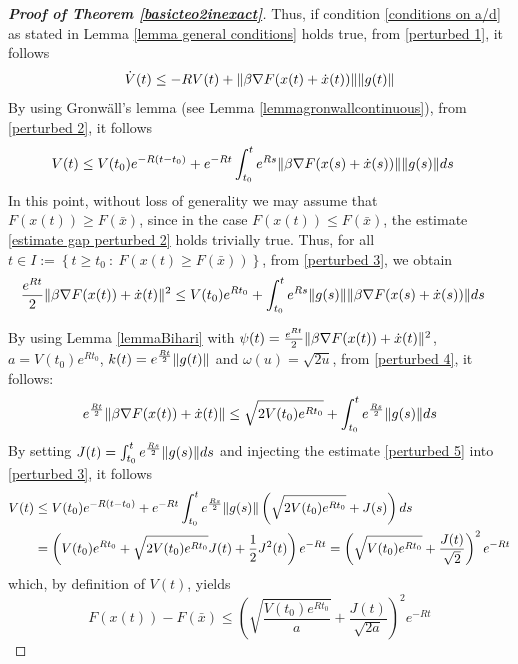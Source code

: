 \documentclass[reqno]{amsart}
\theoremstyle{plain}
\theoremstyle{definition}
\theoremstyle{remark}
\DeclarePairedDelimiter{\norm}{\lVert}{\rVert}	%
\begin{document}
\begin{proof}[\textbf{Proof of Theorem \ref{basicteo2inexact}}]
	Thus, if condition \eqref{conditions on a/d} as stated in Lemma \ref{lemma general conditions} holds true, from \eqref{perturbed 1}, it follows
	\begin{equation}\label{perturbed 2}
		\dot{V}(t)  \leq -RV(t) +\norm{\beta\nabla F(x(t)+\dot{x}(t))}\norm{g(t)}
	\end{equation}
	By using Gronw\"all's lemma (see Lemma \ref{lemmagronwallcontinuous}), from \eqref{perturbed 2}, it follows
	\begin{equation}\label{perturbed 3}
		\begin{aligned}
			V(t) & \leq V(t_{0})e^{-R(t-t_{0})} + e^{-Rt}\int_{t_{0}}^{t}e^{Rs}\norm{\beta\nabla F(x(s)+\dot{x}(s))}\norm{g(s)} ds
		\end{aligned}
	\end{equation}
		In this point, without loss of generality we may assume that $F(x(t)) \geq F(\bar{x})$, since in the case $F(x(t)) \leq F(\bar{x})$, the estimate \eqref{estimate gap perturbed 2} holds trivially true.
Thus, for all $t\in I:=\left\{t\geq t_{0}~:~F(x(t) \geq F(\bar{x}))\right\}$, from \eqref{perturbed 3}, we obtain
	\begin{equation}\label{perturbed 4}
		\begin{aligned}
			\frac{e^{Rt}}{2}\norm{\beta\nabla F(x(t)) + \dot{x}(t)}^{2} & \leq	V(t_{0})e^{Rt_{0}} + \int_{t_{0}}^{t}e^{Rs}\norm{g(s)}\norm{\beta\nabla F(x(s)+\dot{x}(s))} ds		
		\end{aligned}
	\end{equation}
	
	
	By using Lemma \ref{lemmaBihari} with $\psi(t)=\frac{e^{Rt}}{2}\norm{\beta\nabla F(x(t)) + \dot{x}(t)}^{2}$, $a=V(t_{0})e^{Rt_0}$, $k(t) = e^{\frac{Rt}{2}}\norm{g(t)}$ and $\omega(u) = \sqrt{2u}$, from \eqref{perturbed 4}, it follows:
	\begin{equation}\label{perturbed 5}
		e^{\frac{Rt}{2}}\norm{\beta\nabla F(x(t)) + \dot{x}(t)} \leq \sqrt{2V(t_{0})e^{Rt_{0}}} + \int_{t_{0}}^{t}e^{\frac{Rs}{2}}\norm{g(s)}ds
	\end{equation}
By setting $J(t)=\int_{t_{0}}^{t}e^{\frac{Rs}{2}}\norm{g(s)}ds$ and injecting the estimate \eqref{perturbed 5} into \eqref{perturbed 3}, it follows
	\begin{equation}
		\begin{aligned}
			V(t) &\leq V(t_{0})e^{-R(t-t_{0})} + e^{-Rt}\int_{t_{0}}^{t}e^{\frac{Rs}{2}}\norm{g(s)}\left(\sqrt{2V(t_{0})e^{Rt_{0}}} + J(s) \right)ds \\
			& =\left(V(t_{0})e^{Rt_{0}} + \sqrt{2V(t_{0})e^{Rt_{0}}}J(t) +\frac{1}{2}J^{2}(t) \right)e^{-Rt} = \left(\sqrt{V(t_{0})e^{Rt_{0}}} + \frac{J(t)}{\sqrt{2}}\right)^{2}e^{-Rt}
		\end{aligned}
	\end{equation} 
	which, by definition of  $V(t)$, yields
	\begin{equation}\label{perturbed 6}
		F(x(t)) - F(\bar{x}) \leq \left(\sqrt{\frac{V(t_{0})e^{Rt_{0}}}{a}} + \frac{J(t)}{\sqrt{2a}}\right)^{2}e^{-Rt}
	\end{equation}
	

\end{proof}
\end{document}
